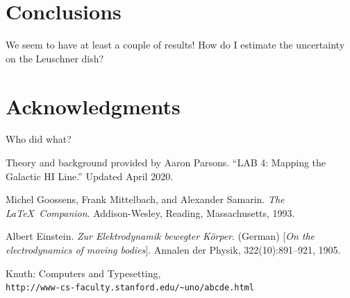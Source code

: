 \documentclass[12pt]{article}
\begin{document}
\section{Conclusions}

\quad \quad We seem to have at least a couple of results! How do I estimate the uncertainty on the Leuschner dish?

\section{Acknowledgments}

\quad \quad Who did what?

Theory and background provided by Aaron Parsons. ``LAB 4: Mapping the Galactic HI Line.'' Updated April 2020.



\begin{thebibliography}{9}
Michel Goossens, Frank Mittelbach, and Alexander Samarin. 
\textit{The \LaTeX\ Companion}. 
Addison-Wesley, Reading, Massachusetts, 1993.

Albert Einstein. 
\textit{Zur Elektrodynamik bewegter K{\"o}rper}. (German) 
[\textit{On the electrodynamics of moving bodies}]. 
Annalen der Physik, 322(10):891–921, 1905.

Knuth: Computers and Typesetting,
\\\texttt{http://www-cs-faculty.stanford.edu/\~{}uno/abcde.html}
\end{thebibliography}
\end{document}
